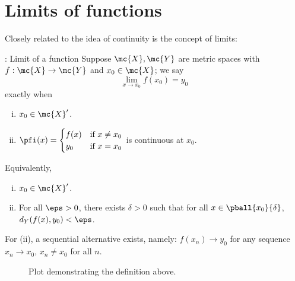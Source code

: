\clearpage

\section{Limits of functions}
Closely related to the idea of continuity is the concept of limits:
\begin{ndef}{: Limit of a function}
	Suppose \(\mc{X},\mc{Y}\) are metric spaces with \(f:\mc{X}\to\mc{Y}\) and \(x_0\in\mc{X}\); we say 
	\begin{equation*}
		\lim_{x\to x_0}f(x_0)=y_0
	\end{equation*}
	exactly when 
	\begin{enumerate}[(i)]
		\item \(x_0\in\mc{X}'\).
		
		\item \(\displaystyle\pfi(x)=\begin{cases}
										f(x)&\text{if}~x\neq x_0\\
										 y_0&\text{if}~x=x_0
									 \end{cases}\) is continuous at \(x_0\).
	\end{enumerate}
	Equivalently,
	\begin{enumerate}[(i)]
		\item \(x_0\in\mc{X}'\).
		
		\item For all \(\eps>0\), there exists \(\delta>0\) such that for all \(x\in\pball{x_0}{\delta}\), \(d_Y(f(x),y_0)<\eps\).
	\end{enumerate}
\end{ndef}
\begin{note}
	For (ii), a sequential alternative exists, namely: \(f(x_n)\to y_0\) for any sequence \(x_n\to x_0\), \(x_n\neq x_0\) for all \(n\).
\end{note}

\begin{figure}[htbp]
	\centering
	\caption{Plot demonstrating the definition above.}
\end{figure}

